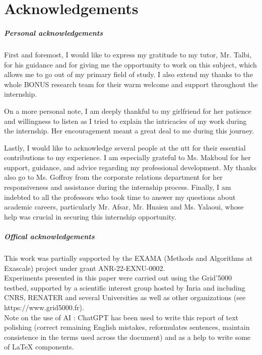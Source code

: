 \chapter*{Acknowledgements}

\paragraph{Personal acknowledgements}

First and foremost, I would like to express my gratitude to my tutor, Mr. Talbi, for his guidance and for giving me the opportunity to work on this subject, which allows me to go out of my primary field of study. I also extend my thanks to the whole BONUS research team for their warm welcome and support throughout the internship.  

On a more personal note, I am deeply thankful to my girlfriend for her patience and willingness to listen as I tried to explain the intricacies of my work during the internship. Her encouragement meant a great deal to me during this journey.  

Lastly, I would like to acknowledge several people at the \acrfull{utt} for their essential contributions to my experience. I am especially grateful to Ms. Makboul for her support, guidance, and advice regarding my professional development. My thanks also go to Ms. Goffroy from the corporate relations department for her responsiveness and assistance during the internship process. Finally, I am indebted to all the professors who took time to answer my questions about academic careers, particularly Mr. Afsar, Mr. Hnaien and Ms. Yalaoui, whose help was crucial in securing this internship opportunity.


\paragraph{Offical acknowledgements}
This work was partially supported by the EXAMA (Methods and Algorithms at Exascale) project under grant ANR-22-EXNU-0002.\\ 

Experiments presented in this paper were carried out using the Grid'5000 testbed, supported by a scientific interest group hosted by Inria and including CNRS, RENATER and several Universities as well as other organizations (see https://www.grid5000.fr).\\

Note on the use of AI : ChatGPT has been used to write this report of text polishing (correct remaining English mistakes, reformulates sentences, maintain consistence in the terms used across the document) and as a help to write some of \LaTeX{} components.